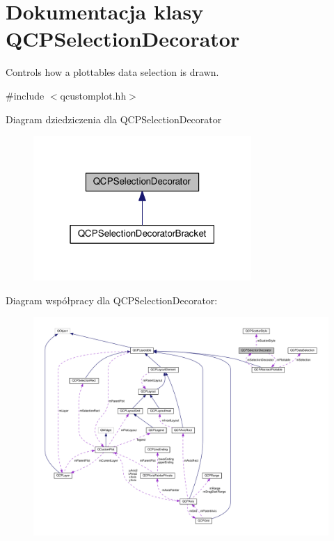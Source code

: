 \hypertarget{class_q_c_p_selection_decorator}{}\section{Dokumentacja klasy Q\+C\+P\+Selection\+Decorator}
\label{class_q_c_p_selection_decorator}


Controls how a plottable\textquotesingle{}s data selection is drawn.  




{\ttfamily \#include $<$qcustomplot.\+hh$>$}



Diagram dziedziczenia dla Q\+C\+P\+Selection\+Decorator\nopagebreak
\begin{figure}[H]
\begin{center}
\leavevmode
\includegraphics[width=235pt]{class_q_c_p_selection_decorator__inherit__graph}
\end{center}
\end{figure}


Diagram współpracy dla Q\+C\+P\+Selection\+Decorator\+:\nopagebreak
\begin{figure}[H]
\begin{center}
\leavevmode
\includegraphics[width=350pt]{class_q_c_p_selection_decorator__coll__graph}
\end{center}
\end{figure}

